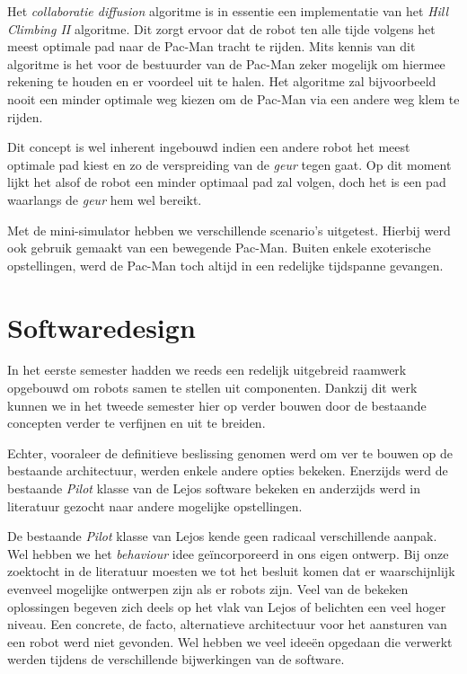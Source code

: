 \documentclass[12pt,a4paper]{report}
\begin{document}
Het \emph{collaboratie diffusion} algoritme is in essentie een implementatie van het \emph{Hill Climbing II} algoritme. Dit zorgt ervoor dat de robot ten alle tijde volgens het meest optimale pad naar de Pac-Man tracht te rijden. Mits kennis van dit algoritme is het voor de bestuurder van de Pac-Man zeker mogelijk om hiermee rekening te houden en er voordeel uit te halen. Het algoritme zal bijvoorbeeld nooit een minder optimale weg kiezen om de Pac-Man via een andere weg klem te rijden.

Dit concept is wel inherent ingebouwd indien een andere robot het meest optimale pad kiest en zo de verspreiding van de \emph{geur} tegen gaat. Op dit moment lijkt het alsof de robot een minder optimaal pad zal volgen, doch het is een pad waarlangs de \emph{geur} hem wel bereikt.

Met de mini-simulator hebben we verschillende scenario's uitgetest. Hierbij werd ook gebruik gemaakt van een bewegende Pac-Man. Buiten enkele exoterische opstellingen, werd de Pac-Man toch altijd in een redelijke tijdspanne gevangen.

\chapter{Softwaredesign}

In het eerste semester hadden we reeds een redelijk uitgebreid raamwerk opgebouwd om robots samen te stellen uit componenten. Dankzij dit werk kunnen we in het tweede semester hier op verder bouwen door de bestaande concepten verder te verfijnen en uit te breiden.

Echter, vooraleer de definitieve beslissing genomen werd om ver te bouwen op de bestaande architectuur, werden enkele andere opties bekeken. Enerzijds werd de bestaande \emph{Pilot} klasse van de Lejos software bekeken en anderzijds werd in literatuur gezocht naar andere mogelijke opstellingen.

De bestaande \emph{Pilot} klasse van Lejos kende geen radicaal verschillende aanpak. Wel hebben we het \emph{behaviour} idee ge\"incorporeerd in ons eigen ontwerp. Bij onze zoektocht in de literatuur moesten we tot het besluit komen dat er waarschijnlijk evenveel mogelijke ontwerpen zijn als er robots zijn. Veel van de bekeken oplossingen begeven zich deels op het vlak van Lejos of belichten een veel hoger niveau. Een concrete, de facto, alternatieve architectuur voor het aansturen van een robot werd niet gevonden. Wel hebben we veel idee\"en opgedaan die verwerkt werden tijdens de verschillende bijwerkingen van de software.
\end{document}
